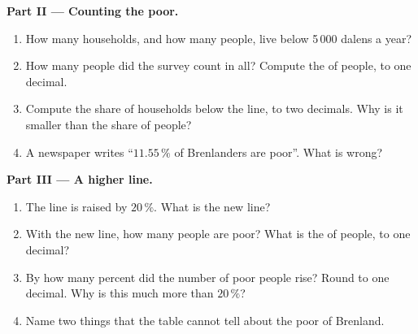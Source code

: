 \begin{problem}
\medskip
\noindent\textbf{Part II --- Counting the poor.}
\begin{enumerate}[resume]
  \item How many households, and how many people, live below 5\,000 dalens a year?
  \item How many people did the survey count in all? Compute the  of
        people, to one decimal.
  \item Compute the share of households below the line, to two decimals. Why is it
        smaller than the share of people?
  \item A newspaper writes ``$11.55\,\%$ of Brenlanders are poor''. What is wrong?
\end{enumerate}

\medskip
\noindent\textbf{Part III --- A higher line.}
\begin{enumerate}[resume]
  \item The line is raised by $20\,\%$. What is the new line?
  \item With the new line, how many people are poor? What is the  of
        people, to one decimal?
  \item By how many percent did the number of poor people rise? Round to one
        decimal. Why is this much more than $20\,\%$?
  \item Name two things that the table cannot tell about the poor of Brenland.
\end{enumerate}
\end{problem}
